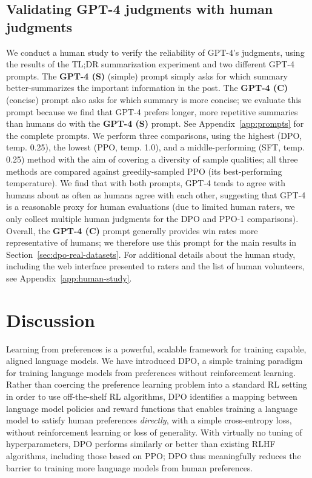 \subsection{Validating GPT-4 judgments with human judgments}
\label{sec:human-judgments}
We conduct a human study to verify the reliability of GPT-4's judgments, using the results of the TL;DR summarization experiment and two different GPT-4 prompts. The \textbf{GPT-4 (S)} (simple) prompt simply asks for which summary better-summarizes the important information in the post. The \textbf{GPT-4 (C)} (concise) prompt also asks for which summary is more concise; we evaluate this prompt because we find that GPT-4 prefers longer, more repetitive summaries than humans do with the \textbf{GPT-4 (S)} prompt. See Appendix~\ref{app:prompts} for the complete prompts. We perform three comparisons, using the highest (DPO, temp. 0.25), the lowest (PPO, temp. 1.0), and a middle-performing (SFT, temp. 0.25) method with the aim of covering a diversity of sample qualities; all three methods are compared against greedily-sampled PPO (its best-performing temperature). We find that with both prompts, GPT-4 tends to agree with humans about as often as humans agree with each other, suggesting that GPT-4 is a reasonable proxy for human evaluations (due to limited human raters, we only collect multiple human judgments for the DPO and PPO-1 comparisons). Overall, the \textbf{GPT-4 (C)} prompt generally provides win rates more representative of humans; we therefore use this prompt for the main results in Section~\ref{sec:dpo-real-datasets}. For additional details about the human study, including the web interface presented to raters and the list of human volunteers, see Appendix~\ref{app:human-study}.













\section{Discussion}
Learning from preferences is a powerful, scalable framework for training capable, aligned language models. We have introduced DPO, a simple training paradigm for training language models from preferences without reinforcement learning. Rather than coercing the preference learning problem into a standard RL setting in order to use off-the-shelf RL algorithms, DPO identifies a mapping between language model policies and reward functions that enables training a language model to satisfy human preferences \textit{directly}, with a simple cross-entropy loss, without reinforcement learning or loss of generality. With virtually no tuning of hyperparameters, DPO performs similarly or better than existing RLHF algorithms, including those based on PPO; DPO thus meaningfully reduces the barrier to training more language models from human preferences.

